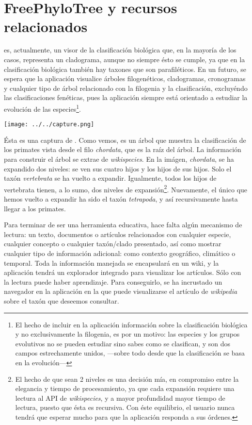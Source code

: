 \section{FreePhyloTree y recursos relacionados}
\label{chap:softwares}

\fpt es, actualmente, un visor de la clasificación biológica que, en la
mayoría de los casos, representa un cladograma, aunque no siempre ésto
se cumple, ya que en la clasificación biológica también hay taxones
que son parafiléticos. En un futuro, se espera que la aplicación
visualice árboles filogenéticos, cladogramas, cronogramas y cualquier
tipo de árbol relacionado con la filogenia y la clasificación,
excluyéndo las clasificaciones fenéticas, pues la aplicación siempre
está orientado a estudiar la evolución de las especies\footnote{El
  hecho de incluir en la aplicación información sobre la clasificación
  biológica y no exclusivamente la filogenia, es por un motivo: las
  especies y los grupos evolutivos no se pueden estudiar sino sabes
  como se clasifican, y son dos campos estrechamente unidos,
  \----sobre todo desde que la clasificación se basa en la
  evolución\----}.

\begin{center}
\texttt{[image: ../../capture.png]}
\end{center}

Ésta es una captura de \fpt. Como vemos, es un árbol que muestra la
clasificación de los primates vista desde el filo
\textit{chordata}, que es la raíz del árbol. La información para
construir el árbol se extrae de \textit{wikispecies}. En la imágen,
\textit{chordata}, se ha expandido dos niveles: se ven sus cuatro
hijos y los hijos de sus hijos. Solo el taxón \textit{vertebrata} se ha
vuelto a expandir. Igualmente, todos los hijos de vertebrata tienen, a
lo sumo, dos niveles de expansión\footnote{El hecho de que sean 2
  niveles es una decisión mía, en compromiso entre la elegancia y
  tiempo de procesamiento, ya que cada expansión requiere una lectura
  al API de \textit{wikispecies}, y a mayor profundidad mayor tiempo
  de lectura, puesto que ésta es recursiva. Con éste equilibrio, el
  usuario nunca tendrá que esperar mucho para que la aplicación
  responda a sus órdenes.}. Nuevamente, el único que hemos vuelto a
expandir ha sido el taxón \textit{tetrapoda}, y así recursivamente
hasta llegar a los primates.

Para terminar de ser una herramienta educativa, hace falta algún
mecanismo de lectura: un texto, documentos o artículos relacionados
con cualquier especie, cualquier concepto o cualquier taxón/clado
presentado, así como mostrar cualquier tipo de información adicional:
como contexto geográfico, climático o temporal. Toda la información
manejada se encapsulará en un wiki, y la aplicación tendrá un
explorador integrado para visualizar los artículos. Sólo con la
lectura puede haber aprendizaje. Para conseguirlo, se ha incrustado un
navegador en la aplicación en la que puede visualizarse el artículo de
\textit{wikipedia} sobre el taxón que deseemos consultar.

